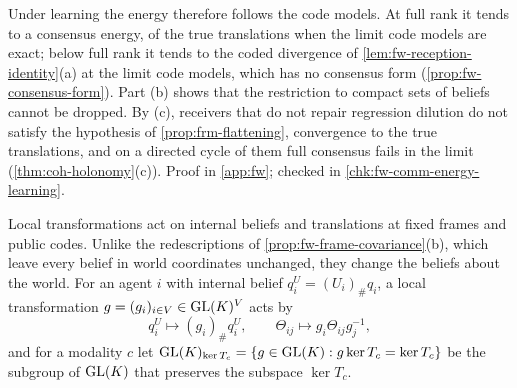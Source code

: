 Under learning the energy therefore follows the code models. At full rank it tends to a consensus energy, of the true translations when the limit code models are exact; below full rank it tends to the coded divergence of \cref{lem:fw-reception-identity}(a) at the limit code models, which has no consensus form (\cref{prop:fw-consensus-form}). Part (b) shows that the restriction to compact sets of beliefs cannot be dropped. By (c), receivers that do not repair regression dilution do not satisfy the hypothesis of \cref{prop:frm-flattening}, convergence to the true translations, and on a directed cycle of them full consensus fails in the limit (\cref{thm:coh-holonomy}(c)). Proof in \cref{app:fw}; checked in \cref{chk:fw-comm-energy-learning}.

Local transformations act on internal beliefs and translations at fixed frames and public codes. Unlike the redescriptions of \cref{prop:fw-frame-covariance}(b), which leave every belief in world coordinates unchanged, they change the beliefs about the world. For an agent $i$ with internal belief $q^U_i=(U_i)_\#q_i$, a local transformation $g=(g_i)_{i\in V}\in\mathrm{GL}(K)^V$ acts by
\[
q^U_i\mapsto(g_i)_\#q^U_i,\qquad\Theta_{ij}\mapsto g_i\Theta_{ij}g_j^{-1},
\]
and for a modality $c$ let $\mathrm{GL}(K)_{\ker T_c}=\{g\in\mathrm{GL}(K):g\ker T_c=\ker T_c\}$ be the subgroup of $\mathrm{GL}(K)$ that preserves the subspace $\ker T_c$.

